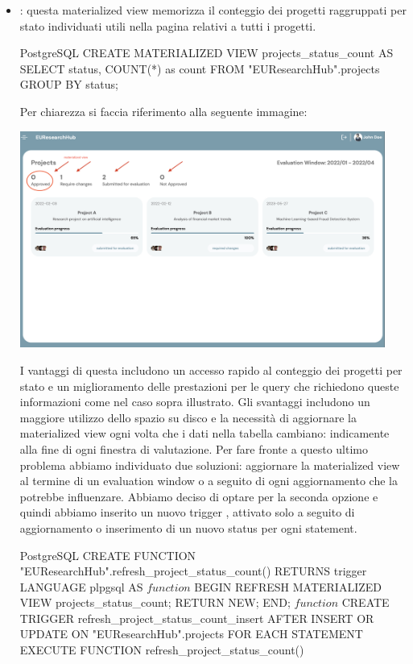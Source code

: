 \documentclass{report}
\begin{document}
\begin{itemize}
\item {}: questa materialized view memorizza il conteggio dei progetti raggruppati per stato individuati utili nella pagina relativi a tutti i progetti. \\

\begin{minipage}{\linewidth}
\begin{imtaCode}{PostgreSQL}
CREATE MATERIALIZED VIEW projects_status_count AS
SELECT status, COUNT(*) as count
FROM "EUResearchHub".projects
GROUP BY status;
\end{imtaCode}
\end{minipage}

Per chiarezza si faccia riferimento alla seguente immagine:
\begin{center}
\includegraphics[width=12cm]{4.png}
\end{center}
I vantaggi di questa includono un accesso rapido al conteggio dei progetti per stato e un miglioramento delle prestazioni per le query che richiedono queste informazioni come nel caso sopra illustrato. Gli svantaggi includono un maggiore utilizzo dello spazio su disco e la necessità di aggiornare la materialized view ogni volta che i dati nella tabella  cambiano: indicamente alla fine di ogni finestra di valutazione.  Per fare fronte a questo ultimo problema abbiamo individuato due soluzioni: aggiornare la materialized view al termine di un evaluation window o a seguito di ogni aggiornamento che la potrebbe influenzare. Abbiamo deciso di optare per la seconda opzione e quindi abbiamo inserito un nuovo trigger , attivato solo a seguito di aggiornamento o inserimento di un nuovo status per ogni statement.  \\

\begin{minipage}{\linewidth}
\begin{imtaCode}{PostgreSQL}
CREATE FUNCTION "EUResearchHub".refresh_project_status_count()
 RETURNS trigger
 LANGUAGE plpgsql
AS $function$
BEGIN
  REFRESH MATERIALIZED VIEW projects_status_count;
  RETURN NEW;
END;
$function$
CREATE TRIGGER refresh_project_status_count_insert 
AFTER INSERT OR UPDATE
ON "EUResearchHub".projects 
FOR EACH STATEMENT
EXECUTE FUNCTION refresh_project_status_count()
\end{imtaCode}
\end{minipage}
\end{itemize}
\end{document}
